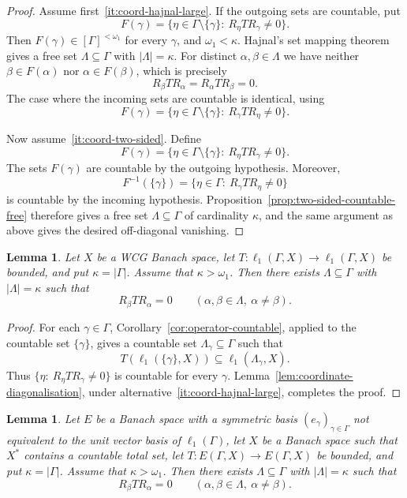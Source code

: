 \documentclass[11pt]{amsart}
\theoremstyle{plain}
\newtheorem{lemma}[theorem]{Lemma}
\theoremstyle{definition}
\numberwithin{equation}{section}
\newcommand{\abs}[1]{\left|#1\right|}
\begin{document}
\begin{proof}
Assume first~\ref{it:coord-hajnal-large}.  If the outgoing sets are countable,
put
\[
    F(\gamma)=
    \{\eta\in\Gamma\setminus\{\gamma\}:\ R_\eta T R_\gamma\neq0\}.
\]
Then $F(\gamma)\in[\Gamma]^{<\omega_1}$ for every $\gamma$, and
$\omega_1<\kappa$.  Hajnal's set mapping theorem gives a free set
$\Lambda\subseteq\Gamma$ with $\abs{\Lambda}=\kappa$.  For distinct
$\alpha,\beta\in\Lambda$ we have neither $\beta\in F(\alpha)$ nor
$\alpha\in F(\beta)$, which is precisely
\[
    R_\beta T R_\alpha=R_\alpha T R_\beta=0.
\]
The case where the incoming sets are countable is identical, using
\[
    F(\gamma)=
    \{\eta\in\Gamma\setminus\{\gamma\}:\ R_\gamma T R_\eta\neq0\}.
\]

Now assume~\ref{it:coord-two-sided}.  Define
\[
    F(\gamma)=
    \{\eta\in\Gamma\setminus\{\gamma\}:\ R_\eta T R_\gamma\neq0\}.
\]
The sets $F(\gamma)$ are countable by the outgoing hypothesis.  Moreover,
\[
    F^{-1}(\{\gamma\})
    =
    \{\eta\in\Gamma:\ R_\gamma T R_\eta\neq0\}
\]
is countable by the incoming hypothesis.  Proposition~\ref{prop:two-sided-countable-free}
therefore gives a free set $\Lambda\subseteq\Gamma$ of cardinality $\kappa$, and
the same argument as above gives the desired off-diagonal vanishing.
\end{proof}

\begin{lemma}\label{lem:block-decomp1}
Let $X$ be a WCG Banach space, let $T\colon\ell_1(\Gamma, X)\to\ell_1(\Gamma, X)$ be bounded, and put $\kappa=\abs{\Gamma}$.  Assume that $\kappa>\omega_1$.  Then there exists $\Lambda\subseteq\Gamma$ with $\abs{\Lambda}=\kappa$ such that
\[
    R_\beta T R_\alpha=0\qquad(\alpha,\beta\in\Lambda,\ \alpha\neq\beta).
\]
\end{lemma}

\begin{proof}
For each $\gamma\in\Gamma$, Corollary~\ref{cor:operator-countable}, applied to the countable set $\{\gamma\}$, gives a countable set $\Lambda_\gamma\subseteq\Gamma$ such that
\[
    T(\ell_1(\{\gamma\},X))\subseteq\ell_1(\Lambda_\gamma,X).
\]
Thus $\{\eta:\ R_\eta T R_\gamma\neq0\}$ is countable for every $\gamma$.  Lemma~\ref{lem:coordinate-diagonalisation}, under alternative~\ref{it:coord-hajnal-large}, completes the proof.
\end{proof}

\begin{lemma}\label{lem:block-decomp2}
Let $E$ be a Banach space with a symmetric basis $(e_\gamma)_{\gamma\in\Gamma}$ not equivalent to the unit vector basis of $\ell_1(\Gamma)$, let $X$ be a Banach space such that $X^*$ contains a countable total set, let $T\colon E(\Gamma, X)\to E(\Gamma, X)$ be bounded, and put $\kappa=\abs{\Gamma}$.  Assume that $\kappa>\omega_1$.  Then there exists $\Lambda\subseteq\Gamma$ with $\abs{\Lambda}=\kappa$ such that
\[
    R_\beta T R_\alpha = 0\qquad(\alpha,
    \beta\in\Lambda,\ \alpha\neq\beta).
\]
\end{lemma}
\end{document}
